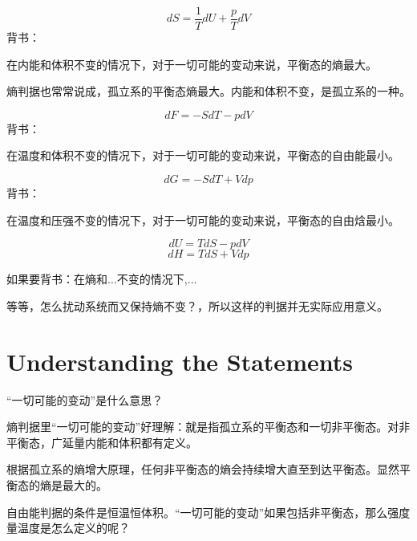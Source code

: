 \documentclass[CJK]{beamer}
\begin{document}
\begin{frame}
\bch
$$dS = \frac{1}{T} dU + \frac{p}{T} dV $$
背书：

在内能和体积不变的情况下，对于一切可能的变动来说，平衡态的熵最大。

\skiplines

熵判据也常常说成，孤立系的平衡态熵最大。内能和体积不变，是孤立系的一种。
\ech
\end{frame}


\begin{frame}
\bch
$$dF = -S dT - p dV $$
背书：

在温度和体积不变的情况下，对于一切可能的变动来说，平衡态的自由能最小。

\ech
\end{frame}


\begin{frame}
\bch
$$dG = -S dT + V dp$$
背书：

在温度和压强不变的情况下，对于一切可能的变动来说，平衡态的自由焓最小。

\ech
\end{frame}


\begin{frame}
\bch
$$dU = TdS - pdV$$
$$dH = TdS + Vdp $$

如果要背书：在熵和$\ldots$不变的情况下,$\ldots$

\skipline

等等，怎么扰动系统而又保持熵不变？，所以这样的判据并无实际应用意义。
\ech
\end{frame}


\section{Understanding the Statements}

\begin{frame}
\bch
“一切可能的变动”是什么意思？

\ech
\end{frame}

\begin{frame}
\bch
熵判据里“一切可能的变动”好理解：就是指孤立系的平衡态和一切非平衡态。对非平衡态，广延量内能和体积都有定义。



根据孤立系的熵增大原理，任何非平衡态的熵会持续增大直至到达平衡态。显然平衡态的熵是最大的。

\ech
\end{frame}


\begin{frame}
\bch
自由能判据的条件是恒温恒体积。“一切可能的变动”如果包括非平衡态，那么强度量温度是怎么定义的呢？


\ech
\end{frame}
\end{document}
